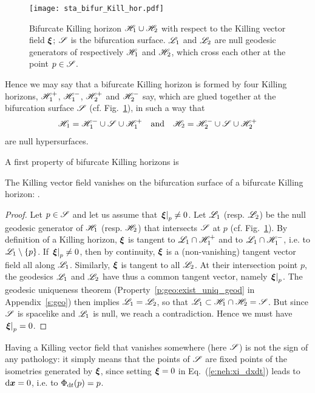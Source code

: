 \begin{figure}
\centerline{\texttt{[image: sta\_bifur\_Kill\_hor.pdf]}}
\caption[]{\label{f:sta:bifur_Kill_hor} \footnotesize
Bifurcate Killing horizon $\mathscr{H}_1\cup\mathscr{H}_2$ with respect to the Killing vector
field $\bm{\xi}$; $\mathscr{S}$ is the bifurcation surface. $\mathscr{L}_1$ and $\mathscr{L}_2$ are
null geodesic generators of respectively $\mathscr{H}_1$ and $\mathscr{H}_2$, which cross
each other at the point $p\in\mathscr{S}$.}
\end{figure}

Hence we may say that a bifurcate Killing horizon is formed by four Killing horizons,
$\mathscr{H}_1^+$, $\mathscr{H}_1^-$, $\mathscr{H}_2^+$ and $\mathscr{H}_2^-$ say,
which are glued together at the bifurcation surface $\mathscr{S}$ (cf. Fig.~\ref{f:sta:bifur_Kill_hor}), in such a way that
\[
    \mathscr{H}_1 = \mathscr{H}_1^- \cup \mathscr{S} \cup \mathscr{H}_1^+ \quad \mbox{and}\quad
    \mathscr{H}_2 = \mathscr{H}_2^- \cup \mathscr{S} \cup \mathscr{H}_2^+
\]
are null hypersurfaces.

A first property of bifurcate Killing horizons is
\begin{prop}
\label{p:sta:xi_S_zero}
The Killing vector field vanishes on the bifurcation surface of
a bifurcate Killing horizon:
\be \label{e:sta:xi_S_zero}
     .
\ee
\end{prop}
\begin{proof}
Let $p\in \mathscr{S}$ and let us assume that $\left.\bm{\xi}\right| _p\not=0$.
Let $\mathscr{L}_1$ (resp. $\mathscr{L}_2$) be the null geodesic generator of $\mathscr{H}_1$
(resp. $\mathscr{H}_2$) that intersects $\mathscr{S}$ at $p$ (cf. Fig.~\ref{f:sta:bifur_Kill_hor}).
By definition of a Killing horizon,
$\bm{\xi}$ is tangent to $\mathscr{L}_1\cap\mathscr{H}_1^+$ and to $\mathscr{L}_1\cap\mathscr{H}_1^-$,
i.e. to $\mathscr{L}_1\setminus\{p\}$.
If $\left.\bm{\xi}\right| _p \not=0$, then by continuity,
$\bm{\xi}$ is a (non-vanishing) tangent vector field all along $\mathscr{L}_1$.
Similarly, $\bm{\xi}$ is tangent to all $\mathscr{L}_2$.
At their intersection point $p$, the geodesics $\mathscr{L}_1$ and $\mathscr{L}_2$ have thus a common tangent
vector, namely $\left.\bm{\xi}\right| _p$.
The geodesic uniqueness theorem (Property~\ref{p:geo:exist_uniq_geod} in Appendix~\ref{s:geo})
then implies $\mathscr{L}_1 = \mathscr{L}_2$, so that
$\mathscr{L}_1 \subset \mathscr{H}_1 \cap \mathscr{H}_2 = \mathscr{S}$. But since $\mathscr{S}$ is spacelike and
$\mathscr{L}_1$ is null, we reach a contradiction. Hence we must have
$\left.\bm{\xi}\right| _p = 0$.
\end{proof}

\begin{remark}
\label{r:sta:zero_Killing}
Having a Killing vector field that vanishes somewhere (here $\mathscr{S}$) is not the sign
of any pathology: it simply means that the points of $\mathscr{S}$ are fixed points of
the isometries generated by $\bm{\xi}$, since
setting $\bm{\xi}=0$ in Eq.~(\ref{e:neh:xi_dxdt}) leads to $\mathrm{d}\bm{x}=0$, i.e.
to $\Phi_{\mathrm{d} t}(p) = p$.
\end{remark}

